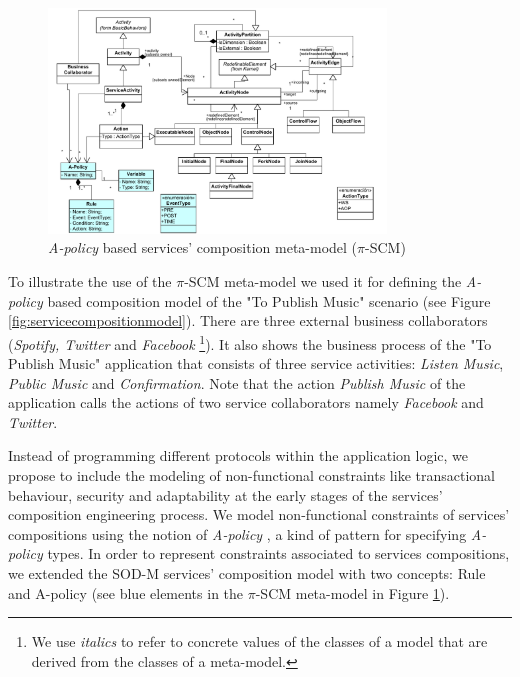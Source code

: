  \begin{figure}[htpb]
\centering
\includegraphics[width=0.80\textwidth]{figs/E-service-composition-metamodel}
\caption{{\em A-policy} based services' composition meta-model ($\pi$-SCM)}
\label{fig:e-scomposition-metamodel}
\end{figure}

To illustrate the use of the $\pi$-SCM meta-model we used it for defining the {\em A-policy} based composition model of the "To Publish Music" scenario (see
Figure \ref{fig:servicecompositionmodel}). There are three external business collaborators ({\em Spotify, Twitter} and {\em Facebook} \footnote{We use {\em italics} to refer to concrete values of the classes of a model that are derived from the classes of a meta-model.}). It also shows the business process  of the  "To Publish Music" application that consists of three service activities: {\em Listen Music}, {\em Public Music} and {\em Confirmation}. Note that  the action {\em Publish Music} of the application calls the actions of two service collaborators namely {\em Facebook} and {\em Twitter}.

Instead of programming different protocols within the application logic, we propose to include the modeling of non-functional constraints like transactional behaviour, security and adaptability  at the early stages of the services' composition engineering process. We model non-functional constraints of services' compositions using the notion of {\em A-policy} \cite{Espinosa-Oviedo2011a,CIC:eovszmc09c}, a kind of pattern for specifying {\em A-policy} types. In order to represent constraints associated to services compositions, we extended the SOD-M services' composition model with two concepts: {\sc Rule} and {\sc A-policy} (see blue elements in the $\pi$-SCM meta-model in Figure \ref{fig:e-scomposition-metamodel}).

